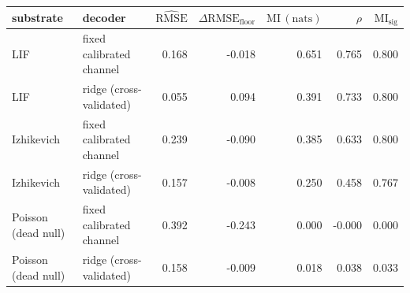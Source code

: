 \begin{tabular}{llrrrrr}
\toprule
substrate & decoder & $\widehat{\mathrm{RMSE}}$ & $\Delta\mathrm{RMSE}_{\mathrm{floor}}$ & $\mathrm{MI}\,\mathrm{(nats)}$ & $\rho$ & $\mathrm{MI}_{\mathrm{sig}}$ \\
\midrule
LIF & fixed calibrated channel & 0.168 & -0.018 & 0.651 & 0.765 & 0.800 \\
LIF & ridge (cross-validated) & 0.055 & 0.094 & 0.391 & 0.733 & 0.800 \\
Izhikevich & fixed calibrated channel & 0.239 & -0.090 & 0.385 & 0.633 & 0.800 \\
Izhikevich & ridge (cross-validated) & 0.157 & -0.008 & 0.250 & 0.458 & 0.767 \\
Poisson (dead null) & fixed calibrated channel & 0.392 & -0.243 & 0.000 & -0.000 & 0.000 \\
Poisson (dead null) & ridge (cross-validated) & 0.158 & -0.009 & 0.018 & 0.038 & 0.033 \\
\bottomrule
\end{tabular}
